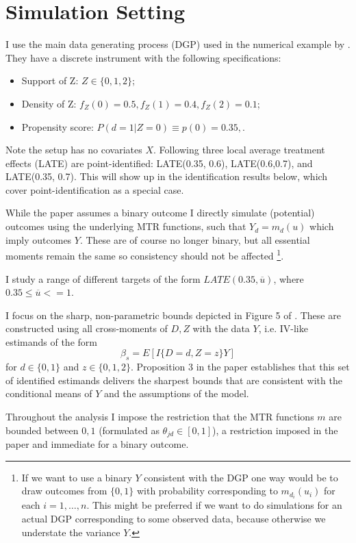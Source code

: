 \documentclass{article}
\begin{document}
\section{Simulation Setting} \label{sec:4_sim}
I use the main data generating process (DGP) used in the numerical example by \cite{mogstad2018using}.
They have a discrete instrument with the following specifications:
\begin{itemize}
    \item Support of Z: $Z\in\{0,1,2\}$;
    \item Density of Z: $f_Z(0) = 0.5, f_Z(1)=0.4, f_Z(2)=0.1$;
    \item Propensity score: $P(d=1|Z=0) \equiv p(0) = 0.35,   $.
\end{itemize}
Note the setup has no covariates $X$. Following \citet{imbens1994identification} three local average treatment effects (LATE) are point-identified: LATE(0.35, 0.6), LATE(0.6,0.7), and LATE(0.35, 0.7).
This will show up in the identification results below, which cover point-identification as a special case.

While the paper assumes a binary outcome I directly simulate (potential) outcomes using the underlying MTR functions, such that $Y_d = m_d(u)$ which imply outcomes $Y$.
These are of course no longer binary, but all essential moments remain the same so consistency should not be affected
\footnote{If we want to use a binary $Y$ consistent with the DGP one way would be to draw outcomes from $\{0,1\}$ with probability corresponding to $m_{d_i}(u_i)$ for each $i=1,\ldots, n$. This might be preferred if we want to do simulations for an actual DGP corresponding to some observed data, because otherwise we understate the variance $Y$.}.

I study a range of different targets of the form $LATE(0.35, \overline{u})$, where $0.35 \leq \overline{u} <= 1$. 

I focus on the sharp, non-parametric bounds depicted in Figure 5 of \cite{mogstad2018using}.
These are constructed using all cross-moments of $D,Z$ with the data $Y$, i.e. IV-like estimands of the form
\begin{equation*}
    \beta_s = E[I\{D=d, Z=z\}Y]
\end{equation*}
for $d\in\{0,1\}$ and $z\in\{0,1,2\}$. Proposition 3 in the paper establishes that this set of identified estimands
delivers the sharpest bounds that are consistent with the conditional means of $Y$ and the assumptions of the model.

Throughout the analysis I impose the restriction that the MTR functions $m$ are bounded between $0,1$ (formulated as $\theta_{jd}\in[0,1]$), a restriction imposed in the paper and immediate for a binary outcome.
\end{document}
